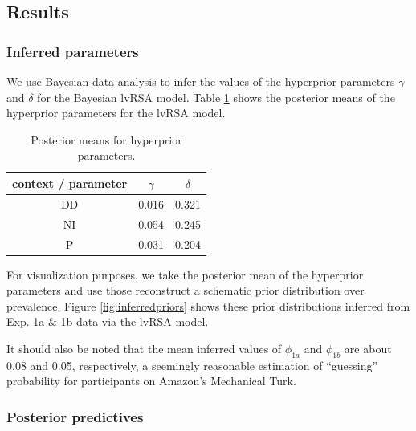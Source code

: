 \documentclass[10pt,letterpaper]{article}
\begin{document}

\subsection{Results}

\subsubsection{Inferred parameters}
We use Bayesian data analysis to infer the values of the hyperprior parameters $\gamma$ and $\delta$ for the Bayesian lvRSA model. Table \ref{table:postmeans} shows the posterior means of the hyperprior parameters for the lvRSA model.

\begin{table}[h]
\centering
\begin{tabular}{c | c | c}
context / parameter & $\gamma$ & $\delta$ \\
\hline
DD                  & 0.016  & 0.321  \\
NI                  & 0.054  & 0.245  \\
P                   & 0.031  & 0.204 
\end{tabular}
\caption{Posterior means for hyperprior parameters.}
\label{table:postmeans}
\end{table}


For visualization purposes, we take the posterior mean of the hyperprior parameters and use those reconstruct a schematic prior distribution over prevalence. Figure \ref{fig:inferredpriors} shows these prior distributions inferred from Exp. 1a \& 1b data via the lvRSA model. 

It should also be noted that the mean inferred values of  $\phi_{1a}$ and $\phi_{1b}$ are about 0.08 and 0.05, respectively, a seemingly reasonable estimation of ``guessing'' probability for participants on Amazon's Mechanical Turk.

\subsubsection{Posterior predictives}
\end{document}
